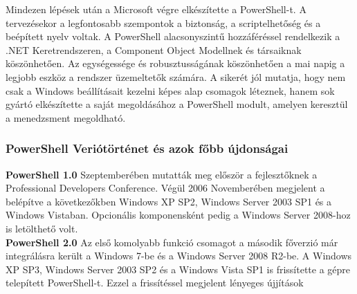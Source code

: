 \documentclass[12pt,oneside,justify,table]{book}
\begin{document}
Mindezen lépések után a Microsoft végre elkészítette a PowerShell-t. A tervezésekor a legfontosabb szempontok a biztonság, a scriptelhetőség és a beépített nyelv voltak. A PowerShell alacsonyszintű hozzáféréssel rendelkezik a .NET Keretrendszeren, a Component Object Modellnek és társaiknak köszönhetően. Az egységessége és robusztusságának köszönhetően a mai napig a legjobb eszköz a rendszer üzemeltetők számára. A sikerét jól mutatja, hogy nem csak a Windows beállításait kezelni képes alap csomagok léteznek, hanem sok gyártó elkészítette a saját megoldásához a PowerShell modult, amelyen keresztül a menedzsment megoldható.
\cite{WindowsPowerShellUnleashed}

\subsubsection{PowerShell Veriótörténet és azok főbb újdonságai}
\noindent\textbf{PowerShell 1.0}
 Szeptemberében mutatták meg először a fejlesztőknek a Professional Developers Conference. 
Végül 2006 Novemberében megjelent a belépítve a következőkben Windows XP SP2, Windows Server 2003 SP1 és a Windows Vistaban. Opcionális komponensként pedig a Windows Server 2008-hoz is letölthető volt.\\
\break
\noindent\textbf{PowerShell 2.0}
\newline Az első komolyabb funkció csomagot a második főverzió már integrálásra került a Windows 7-be és a Windows Server 2008 R2-be. A Windows XP SP3, Windows Server 2003 SP2 és a Windows Vista SP1 is frissítette a gépre telepített PowerShell-t.
Ezzel a frissítéssel megjelent lényeges újjítások
\end{document}
